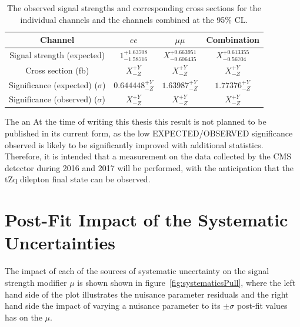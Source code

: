 \begin{table}[!h]
   \centering
   \caption{The observed signal strengths and corresponding cross sections for
   the individual channels and the channels combined at the 95\% CL.}
   \begin{tabular}{cccc}
       \hline
       Channel & $ee$ & $\mu\mu$ & \textbf{Combination} \\
        \hline
       Signal strength (expected) & $1_{-1.58716}^{+1.63708}$ & $X_{-0.606435}^{+0.663951}$ & $X_{-0.56704}^{+0.613355}$ \\
       Cross section (fb) & $X_{-Z}^{+Y}$ & $X_{-Z}^{+Y}$ & $X_{-Z}^{+Y}$ \\
       Significance (expected) ($\sigma$) & $0.644448_{-Z}^{+Y}$ & $1.63987_{-Z}^{+Y}$ & $1.77376_{-Z}^{+Y}$ \\
       Significance (observed) ($\sigma$) & $X_{-Z}^{+Y}$ & $X_{-Z}^{+Y}$ & $X_{-Z}^{+Y}$ \\
    \end{tabular}
   \label{tab:shapetxs}
\end{table}

The an
At the time of writing this thesis this result is not planned to be published in its current form, as the low EXPECTED/OBSERVED significance observed is likely to be significantly improved with additional statistics.
Therefore, it is intended that a measurement on the data collected by the CMS detector during 2016 and 2017 will be performed, with the anticipation that the tZq dilepton final state can be observed.

\section{Post-Fit Impact of the Systematic Uncertainties}\label{sec:uncertainitiesImpact}
The impact of each of the sources of systematic uncertainty on the signal strength modifier $\mu$ is shown shown in figure~\ref{fig:systematicsPull}, where the left hand side of the plot illustrates the nuisance parameter residuals and the right hand side the impact of varying a nuisance parameter to its $\pm \sigma$ post-fit values has on the $\mu$.

%

%

